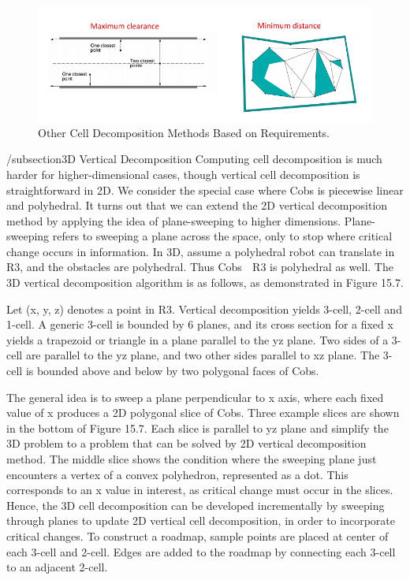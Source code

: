 \documentclass[twoside]{article}
\begin{document}
\begin{figure}[h]
\begin{center}
\includegraphics{fig15_6.PNG}
\caption{Other Cell Decomposition Methods Based on Requirements.}
\end{center}
\end{figure}

/subsection{3D Vertical Decomposition}
Computing cell decomposition is much harder for higher-dimensional cases, though vertical cell decomposition is straightforward in 2D. We consider the special case where Cobs is piecewise linear and polyhedral.
It turns out that we can extend the 2D vertical decomposition method by applying the idea of plane-sweeping to higher dimensions. Plane-sweeping refers to sweeping a plane across the space, only to stop where critical change occurs in information. In 3D, assume a polyhedral robot can translate in R3, and the obstacles are polyhedral. Thus Cobs  R3 is polyhedral as well. The 3D vertical decomposition algorithm is as follows, as demonstrated in Figure 15.7.

Let (x, y, z) denotes a point in R3. Vertical decomposition yields 3-cell, 2-cell and 1-cell. A generic 3-cell is bounded by 6 planes, and its cross section for a fixed x yields a trapezoid or triangle in a plane parallel to the yz plane. Two sides of a 3-cell are parallel to the yz plane, and two other sides parallel to xz plane. The 3-cell is bounded above and below by two polygonal faces of Cobs.

The general idea is to sweep a plane perpendicular to x axis, where each fixed value of x produces a 2D polygonal slice of Cobs. Three example slices are shown in the bottom of Figure 15.7. Each slice is parallel to yz plane and simplify the 3D problem to a problem that can be solved by 2D vertical decomposition method. The middle slice shows the condition where the sweeping plane just encounters a vertex of a convex polyhedron, represented as a dot. This corresponds to an x value in interest, as critical change
must occur in the slices. Hence, the 3D cell decomposition can be developed incrementally by sweeping through planes to update 2D vertical cell decomposition, in order to incorporate critical changes. To construct a roadmap, sample points are placed at center of each 3-cell and 2-cell. Edges are added to the roadmap by connecting each 3-cell to an adjacent 2-cell.
\end{document}
